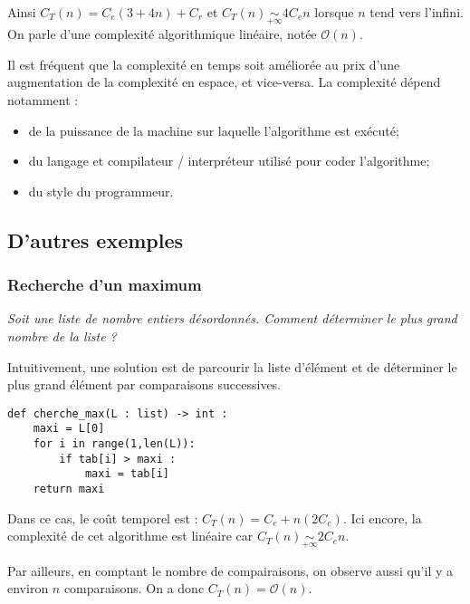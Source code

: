 \begin{exemple}
Ainsi $C_T(n) = C_e (3 + 4n)  + C_r$ et $C_T(n)  \underset{+\infty}{\sim} 4C_e n$ lorsque $n$ tend vers l'infini. On parle d'une complexité algorithmique linéaire, notée $\mathcal{O}(n)$.



\end{exemple}



Il est fréquent que la complexité en temps soit améliorée au prix d'une augmentation de la complexité en espace, et vice-versa.
La complexité dépend notamment :
\begin{itemize}
\item de la puissance de la machine sur laquelle l'algorithme est exécuté;
\item du langage et compilateur / interpréteur utilisé pour coder l'algorithme;
\item du style du programmeur.
\end{itemize}



\subsection{D'autres exemples}
\subsubsection{Recherche d'un maximum}
\begin{exemple}
\textit{Soit une liste de nombre entiers désordonnés. Comment déterminer le plus grand nombre de la liste ?}

Intuitivement, une solution est de parcourir la liste d'élément et de déterminer le plus grand élément par comparaisons successives.

\noindent
\begin{minipage}[c]{.48\linewidth}
\begin{lstlisting}
def cherche_max(L : list) -> int :
    maxi = L[0]
    for i in range(1,len(L)):
        if tab[i] > maxi : 
            maxi = tab[i]
    return maxi
\end{lstlisting}

\end{minipage} \hfill 
\begin{minipage}[c]{.48\linewidth}
Dans ce cas, le coût temporel est :
$C_T(n) = C_e + n\left(2 C_e \right)$. Ici encore, la complexité de cet algorithme est linéaire car $C_T(n) \underset{+\infty}{\sim} 2 C_e n$.

Par ailleurs, en comptant le nombre de compairaisons, on observe aussi qu'il y a environ $n$ comparaisons. On a donc $C_T(n) = \mathcal{O}(n)$.
\end{minipage} 


\end{exemple}

